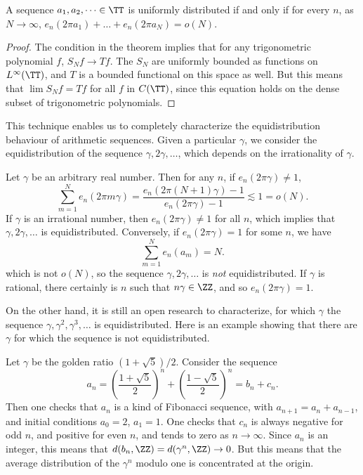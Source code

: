 \begin{theorem}
    A sequence $a_1, a_2, \dots \in \TT$ is uniformly distributed if and only if for every $n$, as $N \to \infty$, $e_n(2 \pi a_1) + \dots + e_n(2 \pi a_N) = o(N)$.
\end{theorem}
\begin{proof}
    The condition in the theorem implies that for any trigonometric polynomial $f$, $S_Nf \to Tf$. The $S_N$ are uniformly bounded as functions on $L^\infty(\TT)$, and $T$ is a bounded functional on this space as well. But this means that $\lim S_N f = T f$ for all $f$ in $C(\TT)$, since this equation holds on the dense subset of trigonometric polynomials.
\end{proof}

This technique enables us to completely characterize the equidistribution behaviour of arithmetic sequences. Given a particular $\gamma$, we consider the equidistribution of the sequence $\gamma, 2 \gamma, \dots$, which depends on the irrationality of $\gamma$.

\begin{example}
    Let $\gamma$ be an arbitrary real number. Then for any $n$, if $e_n(2 \pi \gamma) \neq 1$,
    \[ \sum_{m = 1}^N e_n(2 \pi m \gamma) = \frac{e_n(2 \pi (N + 1) \gamma) - 1}{e_n(2 \pi \gamma) - 1} \lesssim 1 = o(N). \]
    If $\gamma$ is an irrational number, then $e_n(2 \pi \gamma) \neq 1$ for all $n$, which implies that $\gamma, 2\gamma, \dots$ is equidistributed. Conversely, if $e_n(2 \pi \gamma) = 1$ for some $n$, we have
    \[ \sum_{m = 1}^N e_n(a_m) = N. \]
    which is not $o(N)$, so the sequence $\gamma, 2\gamma, \dots$ is {\it not} equidistributed. If $\gamma$ is rational, there certainly is $n$ such that $n \gamma \in \ZZ$, and so $e_n(2 \pi \gamma) = 1$.
\end{example}

On the other hand, it is still an open research to characterize, for which $\gamma$ the sequence $\gamma, \gamma^2, \gamma^3, \dots$ is equidistributed. Here is an example showing that there are $\gamma$ for which the sequence is not equidistributed.

\begin{example}
    Let $\gamma$ be the golden ratio $(1 + \sqrt{5})/2$. Consider the sequence
    \[ a_n = \left( \frac{1 + \sqrt{5}}{2} \right)^n + \left( \frac{1 - \sqrt{5}}{2} \right)^n = b_n + c_n. \]
    Then one checks that $a_n$ is a kind of Fibonacci sequence, with $a_{n+1} = a_n + a_{n-1}$, and initial conditions $a_0 = 2$, $a_1 = 1$. One checks that $c_n$ is always negative for odd $n$, and positive for even $n$, and tends to zero as $n \to \infty$. Since $a_n$ is an integer, this means that $d(b_n, \ZZ) = d(\gamma^n, \ZZ) \to 0$. But this means that the average distribution of the $\gamma^n$ modulo one is concentrated at the origin.
\end{example}

